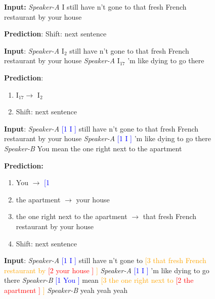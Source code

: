 \documentclass[11pt,a4paper]{article}
\begin{document}
\begin{figure}[ht!]
{\small
\noindent


\begin{tcolorbox}[colback=blue!1, outer arc=0mm,left=0mm, right=0mm,top=0mm,bottom=0mm] {\bf Input:}       
{\it Speaker-A} I still have n't gone to that fresh French restaurant by your house    

{\bf Prediction}: {\sc Shift}: next sentence
\end{tcolorbox}     

\vspace{-0.3cm}
\begin{tcolorbox}[colback=blue!1, outer arc=0mm, left=0mm,right=0mm,top=0mm,bottom=0mm]
{\bf Input}:       
{\it Speaker-A} I$_2$ still have n't gone to that fresh French restaurant by your house {\it Speaker-A} I$_{17}$ 'm like dying to go there

{\bf Prediction}: 
\begin{enumerate}[label=\Alph*,  labelwidth=!, labelindent=0pt, itemsep=0pt, parsep=0pt, topsep=1pt]
\item     I$_{17} \rightarrow$ I$_2$ 
\item     {\sc Shift}: next sentence
\end{enumerate}
\end{tcolorbox}

\vspace{-0.3cm}
\begin{tcolorbox}[colback=blue!1, outer arc=0mm, left=0mm,right=0mm,top=0mm,bottom=0mm]
{\bf Input}:
{\it Speaker-A} \textcolor{blue}{[1 I ]} still have n't gone to that fresh French restaurant by your house {\it Speaker-A} \textcolor{blue}{[1 I ]} 'm like dying to go there {\it Speaker-B} You mean the one right next to the apartment 

{\bf Prediction:} 
\begin{enumerate}[label=\Alph*, labelwidth=!, labelindent=0pt, itemsep=0pt, parsep=0pt, topsep=0pt]
\item You $\rightarrow$ \textcolor{blue}{[1}  \item the apartment  $\rightarrow$ your house  \item the one right next to the apartment $\rightarrow$ that fresh French restaurant by your house 
\item {\sc Shift}: next sentence
\end{enumerate}
\end{tcolorbox} 

\vspace{-0.3cm}
\begin{tcolorbox}[colback=blue!1, outer arc=0mm, left=0mm,right=0mm,top=0mm,bottom=0mm]
{\bf Input}: {\it Speaker-A} \textcolor{blue}{[1 I ]} still have n't gone to \textcolor{orange}{[3 that fresh French restaurant by \textcolor{red}{ [2 your house ]} ]} {\it Speaker-A} \textcolor{blue}{[1 I ]} 'm like dying to go there {\it Speaker-B} \textcolor{blue}{[1 You ]} mean \textcolor{orange}{[3 the one right next to \textcolor{red}{[2 the apartment ]} ] } {\it Speaker-B} yeah yeah yeah


\end{tcolorbox}}
\end{figure}
\end{document}
